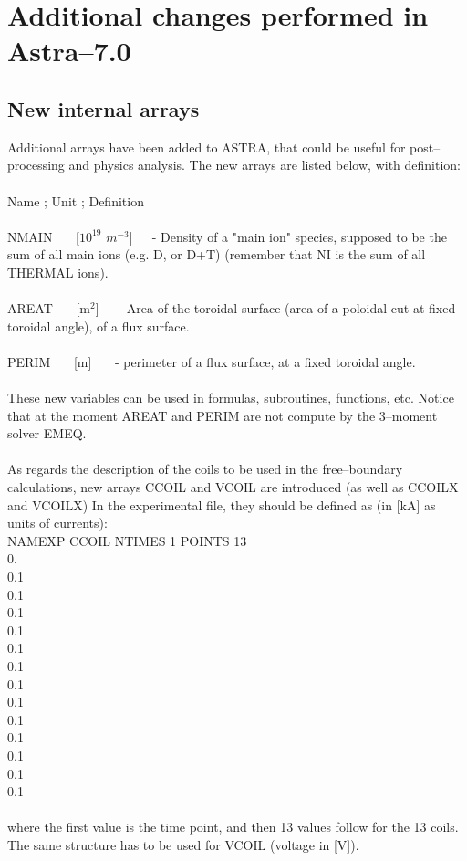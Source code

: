 
\section{Additional changes performed in Astra--7.0}
%
\subsection{New internal arrays}
Additional arrays have been added to ASTRA, that could be useful for post--processing and physics analysis.
The new arrays are listed below, with definition: \\\\
Name ;  Unit  ;  Definition \\\\
NMAIN $\,\,\,\,\,\,\,$ [$10^{19}$ $m^{-3}$] $\,\,\,\,\,\,\,$- Density of a "main ion" species, supposed to be the sum of all main ions (e.g. D, or D+T) (remember that NI is the sum of all THERMAL ions).\\\\
AREAT  $\,\,\,\,\,\,\,$ [m$^2$] $\,\,\,\,\,\,\,$- Area of the toroidal surface (area of a poloidal cut at fixed toroidal angle), of a flux surface.\\\\
PERIM  $\,\,\,\,\,\,\,$ [m]    $\,\,\,\,\,\,\,$ - perimeter of a flux surface, at a fixed toroidal angle.\\\\
These new variables can be used in formulas, subroutines, functions, etc. Notice that at the moment AREAT and PERIM are not compute by the 3--moment solver EMEQ.
\\\\
As regards the description of the coils to be used in the free--boundary calculations, new arrays CCOIL and VCOIL are introduced (as well as CCOILX and VCOILX)
In the experimental file, they should be defined as (in [kA] as units of currents):\\
NAMEXP CCOIL NTIMES 1  POINTS 13 \\
0. \\
0.1  \\ 
0.1\\
0.1\\
0.1\\
0.1\\
0.1\\
0.1\\
0.1\\
0.1\\
0.1\\
0.1\\
0.1\\
0.1\\\\
where the first value is the time point, and then 13 values follow for the 13 coils.
The same structure has to be used for VCOIL (voltage in [V]).
%
